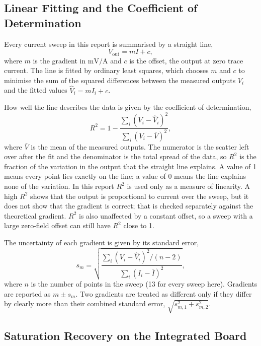 \documentclass[12pt,a4paper]{article}
\begin{document}
\subsection{Linear Fitting and the Coefficient of Determination}
\label{sec:fitting}
 
Every current sweep in this report is summarised by a straight line,
\begin{equation}
V_{\text{out}} = m I + c,
\label{eq:linfit}
\end{equation}
where $m$ is the gradient in $\si{\milli\volt\per\ampere}$ and $c$ is the offset, the output at zero trace current. The line is fitted by ordinary least squares, which chooses $m$ and $c$ to minimise the sum of the squared differences between the measured outputs $V_i$ and the fitted values $\hat{V}_i = m I_i + c$.
 
How well the line describes the data is given by the coefficient of determination,
\begin{equation}
R^2 = 1 - \frac{\sum_i (V_i - \hat{V}_i)^2}{\sum_i (V_i - \bar{V})^2},
\label{eq:r2}
\end{equation}
where $\bar{V}$ is the mean of the measured outputs. The numerator is the scatter left over after the fit and the denominator is the total spread of the data, so $R^2$ is the fraction of the variation in the output that the straight line explains. A value of 1 means every point lies exactly on the line; a value of 0 means the line explains none of the variation. In this report $R^2$ is used only as a measure of linearity. A high $R^2$ shows that the output is proportional to current over the sweep, but it does not show that the gradient is correct; that is checked separately against the theoretical gradient. $R^2$ is also unaffected by a constant offset, so a sweep with a large zero-field offset can still have $R^2$ close to 1.
 
The uncertainty of each gradient is given by its standard error,
\begin{equation}
s_m = \sqrt{\frac{\sum_i (V_i - \hat{V}_i)^2 / (n-2)}{\sum_i (I_i - \bar{I})^2}},
\label{eq:slope-se}
\end{equation}
where $n$ is the number of points in the sweep (13 for every sweep here). Gradients are reported as $m \pm s_m$. Two gradients are treated as different only if they differ by clearly more than their combined standard error, $\sqrt{s_{m,1}^2 + s_{m,2}^2}$.

\subsection{Saturation Recovery on the Integrated Board}
\label{sec:sat-recovery-integrated}
\end{document}
